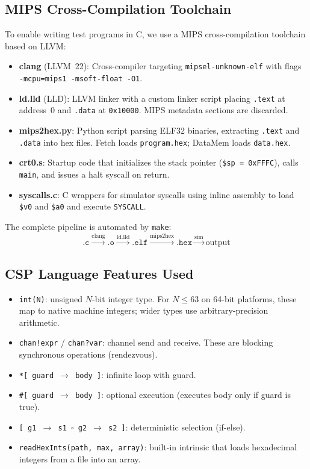\documentclass[11pt]{article}
\begin{document}
\subsection{MIPS Cross-Compilation Toolchain}

To enable writing test programs in C, we use a MIPS cross-compilation
toolchain based on LLVM:

\begin{itemize}
\item \textbf{clang} (LLVM~22): Cross-compiler targeting
  \mbox{\texttt{mipsel-unknown-elf}} with flags
  \texttt{-mcpu=mips1 -msoft-float -O1}.
\item \textbf{ld.lld} (LLD): LLVM linker with a custom linker script
  placing \texttt{.text} at address~0 and \texttt{.data} at
  \texttt{0x10000}.  MIPS metadata sections are discarded.
\item \textbf{mips2hex.py}: Python script parsing ELF32 binaries,
  extracting \texttt{.text} and \texttt{.data} into hex files.
  Fetch loads \texttt{program.hex}; DataMem loads \texttt{data.hex}.
\item \textbf{crt0.s}: Startup code that initializes the stack pointer
  (\texttt{\$sp = 0xFFFC}), calls \texttt{main}, and issues a halt syscall
  on return.
\item \textbf{syscalls.c}: C wrappers for simulator syscalls using inline
  assembly to load \texttt{\$v0} and \texttt{\$a0} and execute
  \texttt{SYSCALL}.
\end{itemize}

The complete pipeline is automated by \texttt{make}:
\[
\texttt{.c} \xrightarrow{\text{clang}} \texttt{.o}
\xrightarrow{\text{ld.lld}} \texttt{.elf}
\xrightarrow{\text{mips2hex}} \texttt{.hex}
\xrightarrow{\text{sim}} \text{output}
\]

\subsection{CSP Language Features Used}

\begin{itemize}
\item \texttt{int(N)}: unsigned $N$-bit integer type.  For $N \leq 63$ on
  64-bit platforms, these map to native machine integers; wider types use
  arbitrary-precision arithmetic.

\item \texttt{chan!expr} / \texttt{chan?var}: channel send and receive.
  These are blocking synchronous operations (rendezvous).

\item \texttt{*[~guard~$\to$~body~]}: infinite loop with guard.

\item \texttt{\#[~guard~$\to$~body~]}: optional execution (executes body
  only if guard is true).

\item \texttt{[~g1~$\to$~s1~$\square$~g2~$\to$~s2~]}: deterministic
  selection (if-else).

\item \texttt{readHexInts(path, max, array)}: built-in intrinsic that loads
  hexadecimal integers from a file into an array.
\end{itemize}
\end{document}
